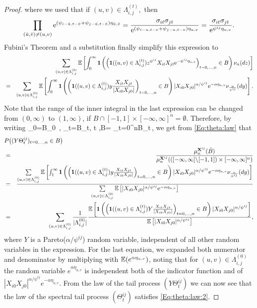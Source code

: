 \begin{proof}
where we used that if $(u,v) \in \Lambda_{i,j}^{(t)},$ then 
$$ \prod_{(\tilde{u},\tilde{v}) \neq (u,v)}{\rm e}^{(\psi_{i-\tilde{u},t-\tilde{v}}+\psi_{j-\tilde{u},t-\tilde{v}})\eta_{\tilde{u},\tilde{v}}}= \frac{\sigma_{it}\sigma_{jt}}{{\rm e}^{(\psi_{i-u,t-v}+\psi_{j-u,t-v})\eta_{u,v}}}=\frac{\sigma_{it}\sigma_{jt}}{{\rm e}^{\psi^{ij}\eta_{u,v}}}. $$  
Fubini's Theorem and a substitution finally simplify this expression to 
\begin{eqnarray*} &&  \sum_{(u,v) \in \Lambda_{i,j}^{(0)}}{\mathbb E}\left[\int_0^\infty \mathbf{1}\left(\left(\mathbf{1}((u,v) \in \Lambda_{i,j}^{(t)})z^{\psi^{ij}}X_{it}X_{jt}{\rm e}^{-\psi^{ij}\eta_{u,v}}\right)_{t=0, \ldots, n} \in B\right)\nu_\alpha(dz)\right]  \\
&=& \sum_{(u,v) \in \Lambda_{i,j}^{(0)}}{\mathbb E}\left[\int_0^\infty \mathbf{1}\left(\left(\mathbf{1}((u,v) \in \Lambda_{i,j}^{(t)})y \frac{X_{it}X_{jt}}{|X_{i0}X_{j0}|}\right)_{t=0, \ldots, n} \in B\right)|X_{i0}X_{j0}|^{\alpha/\psi^{ij}}{\rm e}^{-\alpha \eta_{u,v}}\nu_{\frac{\alpha}{\psi^{ij}}}(dy)\right].
\end{eqnarray*}
Note that the range of the inner integral in the last expression can be changed 
from $(0, \infty)$ to $(1,\infty)$, if $B \cap [-1,1] \times [-\infty,\infty]^n = \emptyset$. 
Therefore, by writing
\beao
{}_0=B_0 \setminus [-1,1] \,, \quad {}_t=B_t, \quad t ,\quad \tilde B=
\times_{t=0}^n\tilde B_t\,,
\eeao 
we get from \eqref{Eq:theta:law} that
\begin{eqnarray*}
\lefteqn{P\big((Y \Theta^{ij}_t)_{t=0,\ldots,n} \in B\big)}\\&=&\frac{\mu^{\bfX^{ij}}_n(\tilde{B})}{\mu^{\bfX^{ij}}_n(
([-\infty,\infty]\backslash [-1,1])\times [-\infty,\infty]^n)}\\
&=& \frac{\sum\limits_{(u,v) \in \Lambda_{i,j}^{(0)}}\E\left[\int_1^\infty \I\left(\left(\I((u,v) \in \Lambda_{i,j}^{(t)})y \frac{X_{it}X_{jt}}{|X_{i0}X_{j0}|}\right)_{t=0, \ldots, n} \in B\right)|X_{i0}X_{j0}|^{\alpha/\psi^{ij}}\ex^{-\alpha \eta_{u,v}}\nu_{\frac{\alpha}{\psi^{ij}}}(dy)\right]}{\sum\limits_{(u,v) \in \Lambda_{i,j}^{(0)}}\E\left[|X_{i0}X_{j0}|^{\alpha/\psi^{ij}}\ex^{-\alpha \eta_{u,v}}\right]} \\
&=& \sum\limits_{(u,v) \in \Lambda_{i,j}^{(0)}}\frac{1}{| \Lambda_{i,j}^{(0)}|}\frac{\E\left[\I\left(\left(\I((u,v) \in \Lambda_{i,j}^{(t)})Y \frac{X_{it}X_{jt}}{|X_{i0}X_{j0}|}\right)_{t=0, \ldots, n} \in B\right)|X_{i0}X_{j0}|^{\alpha/\psi^{ij}}\right]}{\E\left[|X_{i0}X_{j0}|^{\alpha/\psi^{ij}}\right]},
\end{eqnarray*}
where $Y$ is a Pareto($\alpha/\psi^{ij}$) random variable, independent of all other random variables in the expression. For the last equation, we expanded both numerator and denominator by multiplying with ${\mathbb E}(e^{\alpha \eta_{u,v}})$, noting that for $(u,v) \in \Lambda_{i,j}^{(0)}$ the random variable $e^{\alpha \eta_{u,v}}$ is independent both of the indicator function and of $|X_{i0}X_{j0}|^{\alpha/\psi^{ij}}e^{-\alpha \eta_{u,v}}$. From the law of the tail process $(Y \Theta_t^{ij})$ we can now see that the law of the spectral tail process $(\Theta_t^{ij})$ satisfies \eqref{Eq:theta:law:2}.
\end{proof}


